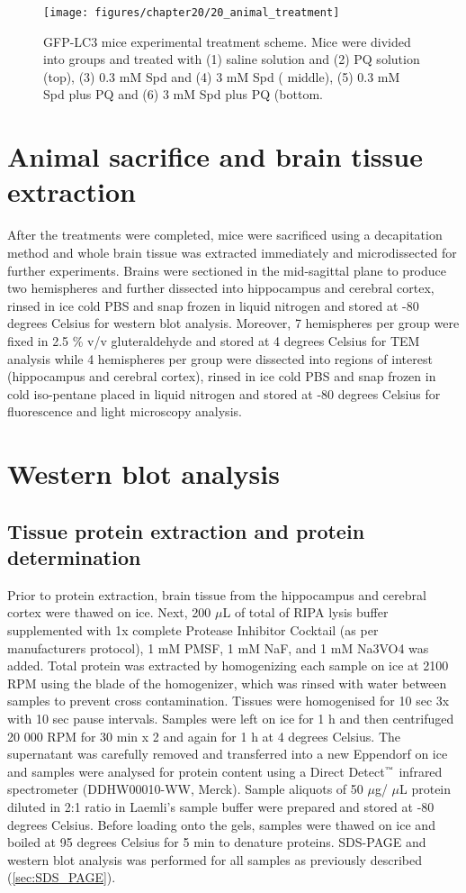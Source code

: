 \begin{figure}[!htbp]
  \texttt{[image: figures/chapter20/20\_animal\_treatment]}
  \caption[GFP-LC3 mice experimental treatment scheme]{GFP-LC3 mice experimental treatment scheme. Mice were divided into groups and treated with (1) saline solution and (2) PQ solution (top), (3) 0.3 mM Spd and (4) 3 mM Spd ( middle), (5) 0.3 mM Spd plus PQ and (6) 3 mM Spd plus PQ (bottom.}
  \label{fig:20_animal_treatment}
\end{figure}

\section{Animal sacrifice and brain tissue extraction}
After the treatments were completed, mice were sacrificed using a decapitation method and whole brain tissue was extracted immediately and microdissected for further experiments. Brains were sectioned in the mid-sagittal plane to produce two hemispheres and further dissected into hippocampus and cerebral cortex, rinsed in ice cold PBS and snap frozen in liquid nitrogen and stored at -80 degrees Celsius for western blot analysis. Moreover, 7 hemispheres per group were fixed in 2.5 \% v/v gluteraldehyde and stored at 4 degrees Celsius for TEM analysis while 4 hemispheres per group were dissected into regions of interest (hippocampus and cerebral cortex), rinsed in ice cold PBS and snap frozen in cold iso-pentane placed in liquid nitrogen and stored at -80 degrees Celsius for fluorescence and light microscopy analysis.

\section{Western blot analysis}
\subsection{Tissue protein extraction and protein determination}
Prior to protein extraction, brain tissue from the hippocampus and cerebral cortex were thawed on ice. Next, 200 $\mu$L of total of RIPA lysis buffer supplemented with 1x complete Protease Inhibitor Cocktail (as per manufacturers protocol), 1 mM PMSF, 1 mM NaF, and 1 mM Na3VO4 was added. Total protein was extracted by homogenizing each sample on ice at 2100 RPM using the blade of the homogenizer, which was rinsed with water between samples to prevent cross contamination. Tissues were homogenised for 10 sec 3x with 10 sec pause intervals. Samples were left on ice for 1 h and then centrifuged 20 000 RPM for 30 min x 2 and again for 1 h at 4 degrees Celsius. The supernatant was carefully removed and transferred into a new Eppendorf on ice and samples were analysed for protein content using a Direct Detect${\textsuperscript{\tiny{\texttrademark}}}$ infrared spectrometer (DDHW00010-WW, Merck). Sample aliquots of 50 $\mu$g/ $\mu$L protein diluted in 2:1 ratio in Laemli's sample buffer were prepared and stored at -80 degrees Celsius. Before loading onto the gels, samples were thawed on ice and boiled at 95 degrees Celsius for 5 min to denature proteins. SDS-PAGE and western blot analysis was performed for all samples as previously described (\cref{sec:SDS_PAGE}). 

